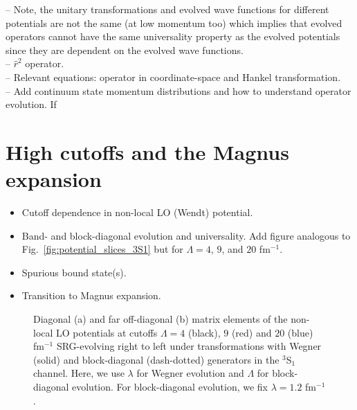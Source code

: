 \documentclass[preprintnumbers,floatfix,aps,prc,preprint,nofootinbib]{revtex4-1}
\begin{document}
%
-- Note, the unitary transformations and evolved wave functions for different potentials are not the same (at low momentum too) which implies that evolved operators cannot have the same universality property as the evolved potentials since they are dependent on the evolved wave functions.
\\
-- $\hat{r}^2$ operator.
\\
-- Relevant equations: operator in coordinate-space and Hankel transformation.
\\
-- Add continuum state momentum distributions and how to understand operator evolution. If 


\section{High cutoffs and the Magnus expansion}
\label{sec:magnus_expansion}


\begin{itemize}
	\item Cutoff dependence in non-local LO (Wendt) potential.
	\item Band- and block-diagonal evolution and universality. Add figure analogous to Fig.~\ref{fig:potential_slices_3S1} but for $\Lambda=4$, $9$, and $20$ fm$^{-1}$.
	\item Spurious bound state(s).
	\item Transition to Magnus expansion.
\end{itemize}
%
\begin{figure}[H]
	\centering
	
	\caption{Diagonal (a) and far off-diagonal (b) matrix elements of the non-local LO potentials at cutoffs $\Lambda=4$ (black), $9$ (red) and $20$ (blue) fm$^{-1}$ SRG-evolving right to left under transformations with Wegner (solid) and block-diagonal (dash-dotted) generators in the $^3$S$_1$ channel. Here, we use $\lambda$ for Wegner evolution and $\Lambda$ for block-diagonal evolution. For block-diagonal evolution, we fix $\lambda=1.2$ fm$^{-1}$.}
	\label{fig:potential_slices_high_cutoffs}
\end{figure}
%
\end{document}
